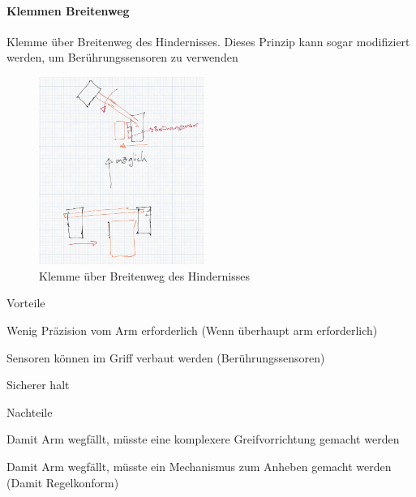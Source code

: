 \documentclass[../main.tex]{subfiles}
\begin{document}
\paragraph{Klemmen Breitenweg}
Klemme über Breitenweg des Hindernisses. Dieses Prinzip kann sogar modifiziert
werden, um Berührungssensoren zu verwenden

\begin{figure}[h]
        \centering
        \includegraphics[width=0.48\textwidth]{img/technologierecherche/Aufnahme/Breiterweg_Griff.jpg}
        \caption{Klemme über Breitenweg des Hindernisses}
        \label{img:tech_Breiterweg_Griff}
\end{figure}

\begin{minipage}[t]{0.48\textwidth}
    \begin{items}
          \item [Vorteile]
          \item Wenig Präzision vom Arm erforderlich (Wenn überhaupt arm erforderlich)
          \item Sensoren können im Griff verbaut werden (Berührungssensoren)
          \item Sicherer halt
    \end{items}
\end{minipage}
\hfill
\begin{minipage}[t]{0.48\textwidth}
    \begin{items}
          \item [Nachteile]
          \item Damit Arm wegfällt, müsste eine komplexere Greifvorrichtung gemacht werden
          \item Damit Arm wegfällt, müsste ein Mechanismus zum Anheben gemacht werden (Damit Regelkonform)
    \end{items}
\end{minipage}
\newpage
\end{document}
